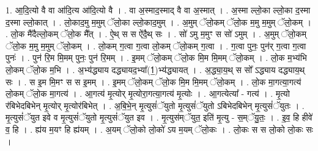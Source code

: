 \documentclass[17pt]{extarticle}
\begin{document}
1. आ॒दि॒त्यो वै वा आ॑दि॒त्य आ॑दि॒त्यो वै । . वा अ॒स्माद॒स्माद् वै वा अ॒स्मात् । . अ॒स्मा ल्लो॒का ल्लो॒का द॒स्मा द॒स्मा ल्लो॒कात् । . लो॒काद॒मु म॒मुम् ॅलो॒का ल्लो॒काद॒मुम् । . अ॒मुम् ॅलो॒कम् ॅलो॒क म॒मु म॒मुम् ॅलो॒कम् । . लो॒क मै॑दैल्लो॒कम् ॅलो॒क मै᳚त् । . ऐ॒थ् स स ऐ॑दै॒थ् सः । . सो॑ ऽमु म॒मुꣳ स सो॑ ऽमुम् । . अ॒मुम् ॅलो॒कम् ॅलो॒क म॒मु म॒मुम् ॅलो॒कम् । . लो॒कम् ग॒त्वा ग॒त्वा लो॒कम् ॅलो॒कम् ग॒त्वा । . ग॒त्वा पुनः॒ पुन॑र् ग॒त्वा ग॒त्वा पुनः॑ । . पुन॑ रि॒म मि॒मम् पुनः॒ पुन॑ रि॒मम् । . इ॒मम् ॅलो॒कम् ॅलो॒क मि॒म मि॒मम् ॅलो॒कम् । . लो॒क म॒भ्य॑भि लो॒कम् ॅलो॒क म॒भि । . अ॒भ्य॑द्ध्याय दद्ध्यायद॒भ्या᳚(1॒)भ्य॑द्ध्यायत् । . अ॒द्ध्या॒य॒थ् स सो᳚ ऽद्ध्याय दद्ध्याय॒थ् सः । . स इ॒म मि॒मꣳ स स इ॒मम् । . इ॒मम् ॅलो॒कम् ॅलो॒क मि॒म मि॒मम् ॅलो॒कम् । . लो॒क मा॒गत्या॒गत्य॑ लो॒कम् ॅलो॒क मा॒गत्य॑ । . आ॒गत्य॑ मृ॒त्योर् मृ॒त्योरा॒गत्या॒गत्य॑ मृ॒त्योः । . आ॒गत्येत्या᳚ - गत्य॑ । . मृ॒त्यो र॑बिभेदबिभेन् मृ॒त्योर् मृ॒त्योर॑बिभेत् । . अ॒बि॒भे॒न् मृ॒त्युसं॑ॅयुतो मृ॒त्युसं॑ॅयुतो ऽबिभेदबिभेन् मृ॒त्युसं॑ॅयुतः । . मृ॒त्युसं॑ॅयुत इवे व मृ॒त्युसं॑ॅयुतो मृ॒त्युसं॑ॅयुत इव । . मृ॒त्युस॑म्ॅयुत॒ इति॑ मृ॒त्यु - स॒म्ॅयु॒तः॒ । . इ॒व॒ हि हीवे॑ व॒ हि । . ह्य॑य म॒यꣳ हि ह्य॑यम् । . अ॒यम् ॅलो॒को लो॒को॑ ऽय म॒यम् ॅलो॒कः । . लो॒कः स स लो॒को लो॒कः सः । \newline
\end{document}
